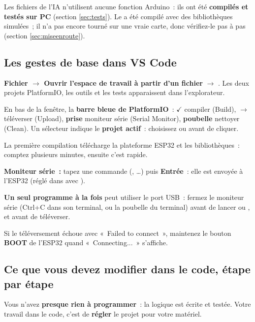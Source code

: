 Les fichiers  de l'IA n'utilisent aucune fonction Arduino~: ils ont été \textbf{compilés et testés sur PC} (section \ref{sec:tests}). Le  a été compilé avec des bibliothèques simulées~; il n'a pas encore tourné sur une vraie carte, donc vérifiez-le pas à pas (section \ref{sec:miseenroute}).

\subsection{Les gestes de base dans VS Code}
\begin{steps}
  \item \textbf{Fichier $\rightarrow$ Ouvrir l'espace de travail à partir d'un fichier} $\rightarrow$ . Les deux projets PlatformIO, les outils et les tests apparaissent dans l'explorateur.
  \item En bas de la fenêtre, la \textbf{barre bleue de PlatformIO}~: \textbf{$\checkmark$} compiler (Build), \textbf{$\rightarrow$} téléverser (Upload), \textbf{prise} moniteur série (Serial Monitor), \textbf{poubelle} nettoyer (Clean). Un sélecteur indique le \textbf{projet actif}~: choisissez  ou  avant de cliquer.
  \item La première compilation télécharge la plateforme ESP32 et les bibliothèques~: comptez plusieurs minutes, ensuite c'est rapide.
  \item \textbf{Moniteur série~:} tapez une commande (, \ldots) puis \textbf{Entrée}~: elle est envoyée à l'ESP32 (réglé dans  avec ).
  \item \textbf{Un seul programme à la fois} peut utiliser le port USB~: fermez le moniteur série (Ctrl+C dans son terminal, ou la poubelle du terminal) avant de lancer  ou , et avant de téléverser.
  \item Si le téléversement échoue avec «~Failed to connect~», maintenez le bouton \textbf{BOOT} de l'ESP32 quand «~Connecting...~» s'affiche.
\end{steps}

\subsection{Ce que vous devez modifier dans le code, étape par étape}
Vous n'avez \textbf{presque rien à programmer}~: la logique est écrite et testée. Votre travail dans le code, c'est de \textbf{régler} le projet pour votre matériel.

